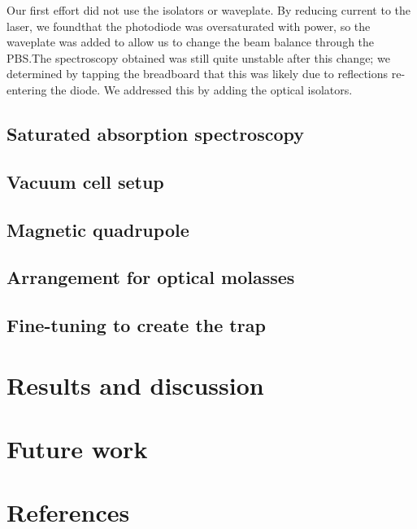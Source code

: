 \documentclass[11pt,twoside,a4paper]{article}
\begin{document}
Our first effort did not use the isolators or waveplate. By reducing current to the laser, we foundthat the photodiode was oversaturated with power, so the waveplate
was added to allow us to change the beam balance through the PBS.\@ The spectroscopy obtained was still quite unstable after this change; we determined by tapping the
breadboard that this was likely due to reflections re-entering the diode. We addressed this by adding the optical isolators.
\subsection{Saturated absorption spectroscopy}
\subsection{Vacuum cell setup}
\subsection{Magnetic quadrupole}
\subsection{Arrangement for optical molasses}
\subsection{Fine-tuning to create the trap}
\section{Results and discussion}
\section{Future work}
\vfill
\pagebreak
\section{References}


\end{document}
